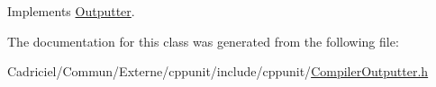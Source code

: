 Implements \hyperlink{class_outputter_a0a5f32693d53ed33ceb8385041cb4b68}{Outputter}.



The documentation for this class was generated from the following file\-:\begin{DoxyCompactItemize}
\item 
Cadriciel/\-Commun/\-Externe/cppunit/include/cppunit/\hyperlink{_compiler_outputter_8h}{Compiler\-Outputter.\-h}\end{DoxyCompactItemize}
